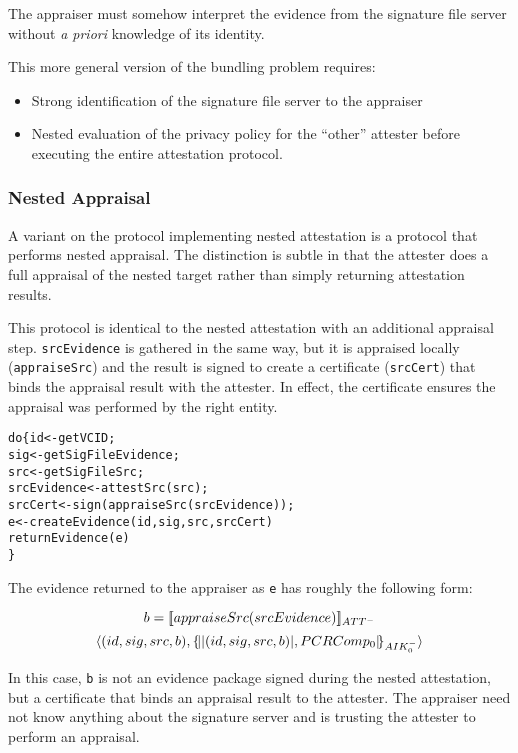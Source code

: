 \documentclass[10pt]{article}
\begin{document}
The appraiser must somehow interpret the evidence from the signature
file server without \emph{a priori} knowledge of its identity.

This more general version of the bundling problem requires:

\begin{itemize}
  \parskip=0pt\itemsep=0pt
\item Strong identification of the signature file server to the appraiser
\item Nested evaluation of the privacy policy for the ``other''
  attester before executing the entire attestation
  protocol.
\end{itemize}

\subsubsection*{Nested Appraisal}

A variant on the protocol implementing nested attestation is a
protocol that performs nested appraisal.  The distinction is subtle in
that the attester does a full appraisal of the nested target rather
than simply returning attestation results.

This protocol is identical to the nested attestation with an
additional appraisal step.  \Verb+srcEvidence+ is gathered in the same
way, but it is appraised locally (\Verb+appraiseSrc+) and the result
is signed to create a certificate (\Verb+srcCert+) that binds the
appraisal result with the attester.  In effect, the certificate
ensures the appraisal was performed by the right entity.

\begin{alltt}
  do \{ id <- getVCID;
       sig <- getSigFileEvidence;
       src <- getSigFileSrc;
       srcEvidence <- attestSrc(src);
       srcCert <- sign(appraiseSrc(srcEvidence));
       e <- createEvidence(id,sig,src,srcCert)
       returnEvidence(e)
  \}
\end{alltt}

The evidence returned to the appraiser as \Verb+e+ has roughly the
following form:

\[b=[\![appraiseSrc(srcEvidence)]\!]_{ATT^{-}}\]
\[\langle (id,sig,src,b),\{\!\lvert \lvert (id,sig,src,b) \rvert,PCRComp_0\rvert\!\}_{AIK_0^{-}}\rangle\]

In this case, \Verb+b+ is not an evidence package signed during the
nested attestation, but a certificate that binds an appraisal result
to the attester.  The appraiser need not know anything about the
signature server and is trusting the attester to perform an
appraisal.
\end{document}
